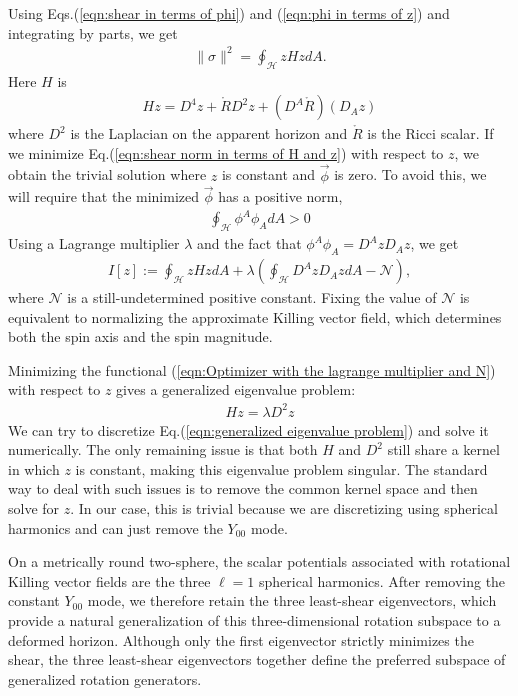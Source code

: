 \documentclass{iopjournal}
\begin{document}
Using Eqs.(\ref{eqn:shear in terms of phi}) and (\ref{eqn:phi in terms of z}) and integrating by parts, we get
\begin{align}
\|\sigma\|^2=\oint_{\mathcal{H}} z H z d A.
\label{eqn:shear norm in terms of H and z}
\end{align}
Here $H$ is
\begin{align}
H z=D^4 z+\mathring{R} D^2 z+(D^A \mathring{R})(D_A z)
\label{eqn:equations for H in terms of laplacians}
\end{align}
where $D^2$ is the Laplacian on the apparent horizon and $\mathring{R}$ is the Ricci scalar. If we minimize Eq.(\ref{eqn:shear norm in terms of H and z}) with respect to $z$, we obtain the trivial solution where $z$ is constant and $\vec{\phi}$ is zero. To avoid this, we will require that the minimized $\vec{\phi}$ has a positive norm,
\begin{align}
\oint_{\mathcal{H}} \phi^A \phi_A d A > 0
\label{eqn:Norm condition to be enforced using Lagrange multiplier}
\end{align}
Using a Lagrange multiplier $\lambda$ and the fact that $\phi^A \phi_A = D^A z D_A z$, we get
\begin{align}
I[z]:=\oint_{\mathcal{H}} z H z d A+\lambda\left(\oint_{\mathcal{H}} D^A z D_A z d A-\mathcal{N}\right),
\label{eqn:Optimizer with the lagrange multiplier and N}
\end{align}
where $\mathcal{N}$ is a still-undetermined positive constant. Fixing the value of $\mathcal{N}$ is equivalent to normalizing the approximate Killing vector field, which determines both the spin axis and the spin magnitude.

Minimizing the functional (\ref{eqn:Optimizer with the lagrange multiplier and N}) with respect to $z$ gives a generalized eigenvalue problem:
\begin{align}
  H z = \lambda D^2 z
  \label{eqn:generalized eigenvalue problem}
\end{align}
We can try to discretize Eq.(\ref{eqn:generalized eigenvalue problem}) and solve it numerically. The only remaining issue is that both $H$ and $D^2$ still share a kernel in which $z$ is constant, making this eigenvalue problem singular. The standard way to deal with such issues is to remove the common kernel space and then solve for $z$. In our case, this is trivial because we are discretizing using spherical harmonics and can just remove the $Y_{00}$ mode.

On a metrically round two-sphere, the scalar potentials associated with rotational Killing vector fields are the three $\ell=1$ spherical harmonics. After removing the constant $Y_{00}$ mode, we therefore retain the three least-shear eigenvectors, which provide a natural generalization of this three-dimensional rotation subspace to a deformed horizon. Although only the first eigenvector strictly minimizes the shear, the three least-shear eigenvectors together define the preferred subspace of generalized rotation generators.
\end{document}
